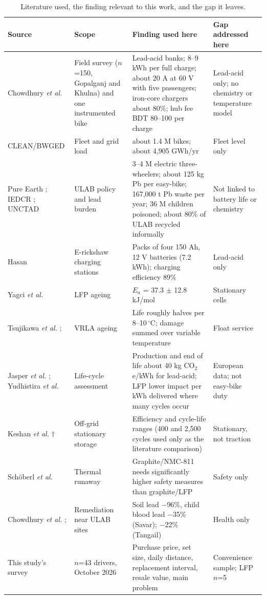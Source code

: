 \documentclass[11pt,a4paper]{article}
\begin{document}
\begin{table}[t]
\caption{Literature used, the finding relevant to this work, and the gap it leaves.}
\label{tab:lit}
\centering\footnotesize
\renewcommand{\arraystretch}{1.1}
\begin{tabular}{p{2.6cm}p{3.0cm}p{6.0cm}p{2.8cm}}
\hline
Source & Scope & Finding used here & Gap addressed here \\
\hline
Chowdhury \emph{et al.} \cite{chowdhury2026} & Field survey ($n$=150, Gopalganj and Khulna) and one instrumented bike & Lead-acid banks; 8--9 kWh per full charge; about 20 A at 60 V with five passengers; iron-core chargers about 80\%; hub fee BDT 80--100 per charge & Lead-acid only; no chemistry or temperature model \\
CLEAN/BWGED \cite{clean2024} & Fleet and grid load & about 1.4 M bikes; about 4{,}905 GWh/yr & Fleet level only \\
Pure Earth \cite{pureearth_smep,fe2024}; IEDCR \cite{das2026}; UNCTAD \cite{unctad_smep} & ULAB policy and lead burden & 3--4 M electric three-wheelers; about 125 kg Pb per easy-bike; 167{,}000 t Pb waste per year; 36 M children poisoned; about 80\% of ULAB recycled informally & Not linked to battery life or chemistry \\
Hasan \cite{hasan2020} & E-rickshaw charging stations & Packs of four 150 Ah, 12 V batteries (7.2 kWh); charging efficiency 89\% & Lead-acid only \\
Yagci \emph{et al.} \cite{yagci2026} & LFP ageing & $E_a$ = 37.3 $\pm$ 12.8 kJ/mol & Stationary cells \\
Tsujikawa \emph{et al.} \cite{tsujikawa2009}; \cite{bu806a} & VRLA ageing & Life roughly halves per 8--10\,$^\circ$C; damage summed over variable temperature & Float service \\
Jasper \emph{et al.} \cite{jasper2025}; Yudhistira \emph{et al.} \cite{yudhistira2022} & Life-cycle assessment & Production and end of life about 40 kg CO$_2$e/kWh for lead-acid; LFP lower impact per kWh delivered where many cycles occur & European data; not easy-bike duty \\
Keshan \emph{et al.} \cite{keshan2016}$\dagger$ & Off-grid stationary storage & Efficiency and cycle-life ranges (400 and 2{,}500 cycles used only as the literature comparison) & Stationary, not traction \\
Sch\"oberl \emph{et al.} \cite{schoberl2024} & Thermal runaway & Graphite/NMC-811 needs significantly higher safety measures than graphite/LFP & Safety only \\
Chowdhury \emph{et al.} \cite{chowdhury2021}; \cite{eos2026} & Remediation near ULAB sites & Soil lead $-$96\%, child blood lead $-$35\% (Savar); $-$22\% (Tangail) & Health only \\
This study's survey \cite{survey2026} & $n$=43 drivers, October 2026 & Purchase price, set size, daily distance, replacement interval, resale value, main problem & Convenience sample; LFP $n$=5 \\
\hline
\end{tabular}
\end{table}
\end{document}
